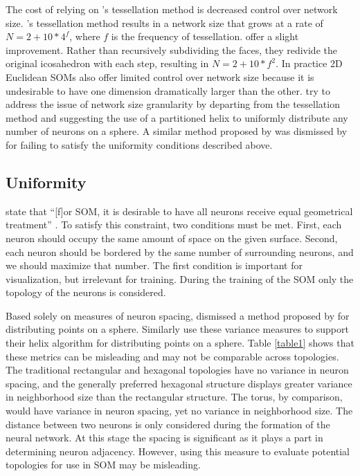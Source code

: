 \documentclass[10pt,titlepage]{article}
\begin{document}
The cost of relying on \citeauthor{ritter99}'s tessellation method is decreased
control over network size. \citeauthor{ritter99}'s tessellation method results
in a network size that grows at a rate of \(N=2+10*4^f\), where $f$ is the
frequency of tessellation. \cite{wu2006} offer a slight improvement. Rather than
recursively subdividing the faces, they redivide the original icosahedron with
each step, resulting in \(N=2+10*f^2\).  In practice 2D Euclidean SOMs also offer
limited control over network size because it is undesirable to have one dimension
dramatically larger than the other. \cite{Nishio:2006fk} try to address the
issue of network size granularity by departing from the tessellation method and
suggesting the use of a partitioned helix to uniformly distribute any number of
neurons on a sphere.  A similar method proposed by \cite{Rakhmanov94} was
dismissed by \cite{wu2005} for failing to satisfy the uniformity conditions
described above.

\subsection{Uniformity}
\citeauthor{wu2006} state that ``[f]or SOM, it is desirable to have all neurons
receive equal geometrical treatment'' \cite[pp. 900]{wu2006}.  To satisfy this
constraint, two conditions must be met.  First, each neuron should occupy the
same amount of space on the given surface.  Second, each neuron should be
bordered by the same number of surrounding neurons, and we should maximize that
number.  The first condition is important for visualization, but
irrelevant for training.  During the training of the SOM only the topology of
the neurons is considered.

Based solely on measures of neuron spacing, \cite{wu2005} dismissed a method
proposed by \cite{Rakhmanov94} for distributing points on a sphere.  Similarly
\cite{Nishio:2006fk} use these variance measures to support their helix
algorithm for distributing points on a sphere.  Table \ref{table1} shows that
these metrics can be misleading and may not be comparable across topologies.
The traditional rectangular and hexagonal topologies have no variance in neuron
spacing, and the generally preferred hexagonal structure displays greater
variance in neighborhood size than the rectangular structure.  The torus, by
comparison, would have variance in neuron spacing, yet no variance in
neighborhood size.  The distance between two neurons is only considered during
the formation of the neural network.  At this stage the spacing is significant
as it plays a part in determining neuron adjacency. However, using this measure
to evaluate potential topologies for use in SOM may be misleading.
\end{document}
